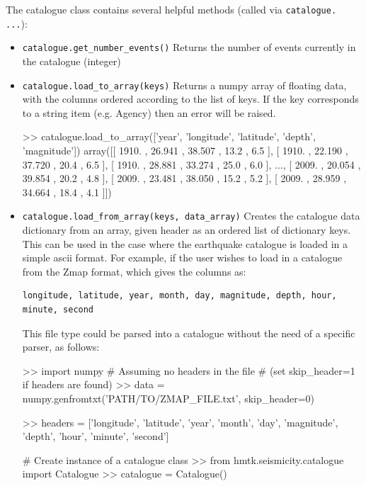 The catalogue class contains several helpful methods (called via \verb=catalogue. ...=):
\begin{itemize}
\item \verb=catalogue.get_number_events()= Returns the number of events currently in the catalogue (integer)

\item \verb=catalogue.load_to_array(keys)= Returns a numpy array of floating data, with the columns ordered according to the list of keys. If the key corresponds to a string item (e.g. Agency) then an error will be raised.

\begin{python}[frame=single]
>> catalogue.load_to_array(['year', 'longitude', 'latitude',
                            'depth', 'magnitude'])
array([[ 1910. ,  26.941 ,  38.507 ,  13.2 ,  6.5 ],
       [ 1910. ,  22.190 ,  37.720 ,  20.4 ,  6.5 ],
       [ 1910. ,  28.881 ,  33.274 ,  25.0 ,  6.0 ],
       ..., 
       [ 2009. ,  20.054 ,  39.854 ,  20.2 ,  4.8 ],
       [ 2009. ,  23.481 ,  38.050 ,  15.2 ,  5.2 ],
       [ 2009. ,  28.959 ,  34.664 ,  18.4 ,  4.1 ]]) 
\end{python}

\item \verb=catalogue.load_from_array(keys, data_array)= Creates the catalogue data dictionary from an array, given header as an ordered list of dictionary keys. This can be used in the case where the earthquake catalogue is loaded in a simple ascii format. For example, if the user wishes to load in a catalogue from the Zmap format, which gives the columns as:

\begin{verbatim}
longitude, latitude, year, month, day, magnitude, depth, hour, 
minute, second
\end{verbatim}

This file type could be parsed into a catalogue without the need of a specific parser, as follows:

\begin{python}[frame=single]
>> import numpy
# Assuming no headers in the file 
# (set skip_header=1 if headers are found)
>> data = numpy.genfromtxt('PATH/TO/ZMAP_FILE.txt',
                           skip_header=0)

>> headers = ['longitude', 'latitude', 'year', 'month',
              'day', 'magnitude', 'depth', 'hour', 
              'minute', 'second']

# Create instance of a catalogue class
>> from hmtk.seismicity.catalogue import Catalogue
>> catalogue = Catalogue()


\end{python}
\end{itemize}
